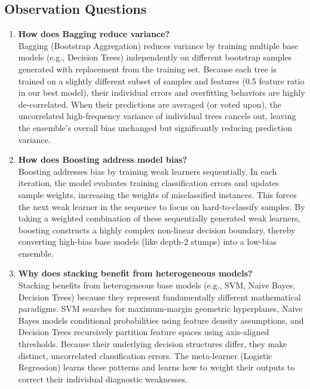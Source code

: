 \documentclass[12pt,a4paper]{article}
\begin{document}
\subsection{Observation Questions}
\begin{enumerate}
    \item \textbf{How does Bagging reduce variance?}\\
    Bagging (Bootstrap Aggregation) reduces variance by training multiple base models (e.g., Decision Trees) independently on different bootstrap samples generated with replacement from the training set. Because each tree is trained on a slightly different subset of samples and features (0.5 feature ratio in our best model), their individual errors and overfitting behaviors are highly de-correlated. When their predictions are averaged (or voted upon), the uncorrelated high-frequency variance of individual trees cancels out, leaving the ensemble's overall bias unchanged but significantly reducing prediction variance.
    
    \item \textbf{How does Boosting address model bias?}\\
    Boosting addresses bias by training weak learners sequentially. In each iteration, the model evaluates training classification errors and updates sample weights, increasing the weights of misclassified instances. This forces the next weak learner in the sequence to focus on hard-to-classify samples. By taking a weighted combination of these sequentially generated weak learners, boosting constructs a highly complex non-linear decision boundary, thereby converting high-bias base models (like depth-2 stumps) into a low-bias ensemble.
    
    \item \textbf{Why does stacking benefit from heterogeneous models?}\\
    Stacking benefits from heterogeneous base models (e.g., SVM, Naive Bayes, Decision Trees) because they represent fundamentally different mathematical paradigms. SVM searches for maximum-margin geometric hyperplanes, Naive Bayes models conditional probabilities using feature density assumptions, and Decision Trees recursively partition feature spaces using axis-aligned thresholds. Because their underlying decision structures differ, they make distinct, uncorrelated classification errors. The meta-learner (Logistic Regression) learns these patterns and learns how to weight their outputs to correct their individual diagnostic weaknesses.
    

\end{enumerate}
\end{document}
